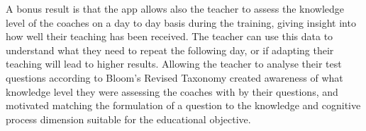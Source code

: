 A bonus result is that the app allows also the teacher to assess the knowledge level of the coaches on a day to day basis during the training, giving insight into how well their teaching has been received. The teacher can use this data to understand what they need to repeat the following day, or if adapting their teaching will lead to higher results. Allowing the teacher to analyse their test questions according to Bloom's Revised Taxonomy created awareness of what knowledge level they were assessing the coaches with by their questions, and motivated matching the formulation of a question to the knowledge and cognitive process dimension suitable for the educational objective.
